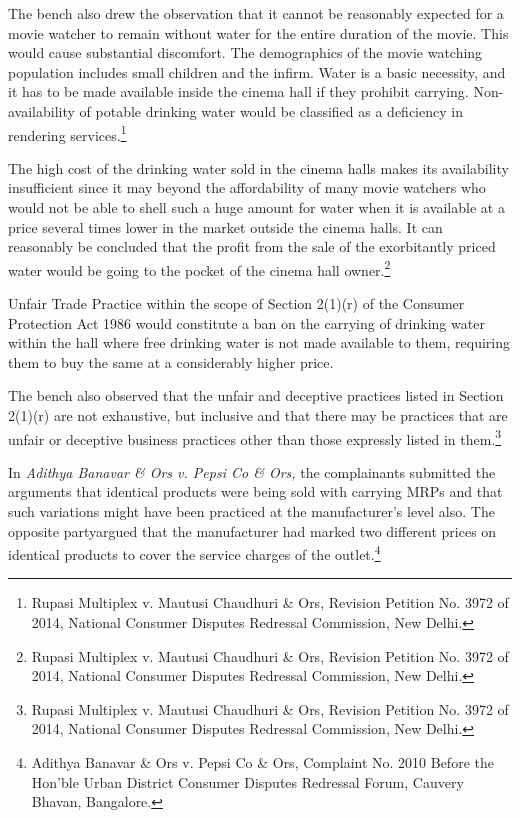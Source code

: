 \begin{multicols}{2}
\vspace{-.1cm}

\noi
The bench also drew the observation that it cannot be reasonably expected for a movie watcher
to remain without water for the entire duration of the movie. This would cause substantial
discomfort. The demographics of the movie watching population includes small children and
the infirm. Water is a basic necessity, and it has to be made available inside the cinema hall if
they prohibit carrying. Non-availability of potable drinking water would be classified as a
deficiency in rendering services.\footnote{Rupasi Multiplex v. Mautusi Chaudhuri \& Ors, Revision Petition No. 3972 of 2014, National Consumer Disputes Redressal Commission, New Delhi.}

\vspace{-.1cm}

\noi
The high cost of the drinking water sold in the cinema halls makes its availability insufficient
since it may beyond the affordability of many movie watchers who would not be able to shell
such a huge amount for water when it is available at a price several times lower in the market
outside the cinema halls. It can reasonably be concluded that the profit from the sale of the
exorbitantly priced water would be going to the pocket of the cinema hall owner.\footnote{Rupasi Multiplex v. Mautusi Chaudhuri \& Ors, Revision Petition No. 3972 of 2014, National Consumer Disputes Redressal Commission, New Delhi.}

\vspace{-.1cm}

\noi
Unfair Trade Practice within the scope of Section 2(1)(r) of the Consumer Protection Act 1986
would constitute a ban on the carrying of drinking water within the hall where free drinking
water is not made available to them, requiring them to buy the same at a considerably higher
price.

\noi
The bench also observed that the unfair and deceptive practices listed in Section 2(1)(r) are not
exhaustive, but inclusive and that there may be practices that are unfair or deceptive business
practices other than those expressly listed in them.\footnote{Rupasi Multiplex v. Mautusi Chaudhuri \& Ors, Revision Petition No. 3972 of 2014, National Consumer Disputes Redressal Commission, New Delhi.}

\noi
In \textit{Adithya Banavar \& Ors v. Pepsi Co \& Ors,} the complainants submitted the arguments that
identical products were being sold with carrying MRPs and that such variations might have
been practiced at the manufacturer’s level also. The opposite partyargued that the manufacturer
had marked two different prices on identical products to cover the service charges of the
outlet.\footnote{Adithya Banavar \& Ors v. Pepsi Co \& Ors, Complaint No. 2010 Before the Hon’ble Urban District Consumer Disputes Redressal Forum, Cauvery Bhavan, Bangalore.}


\end{multicols}
